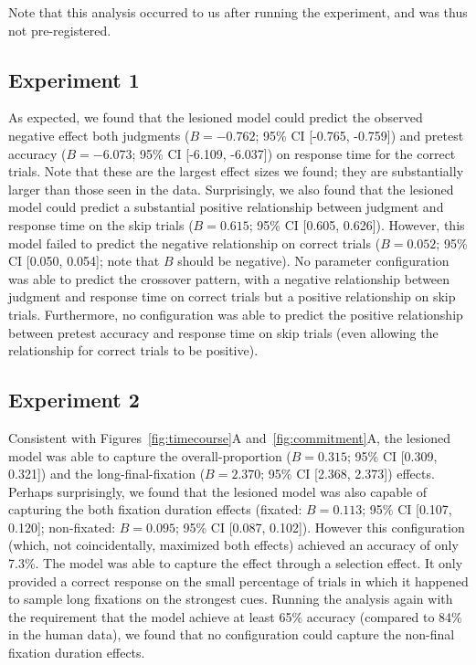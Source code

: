 Note that this analysis occurred to us after running the experiment, and was thus not pre-registered.

\subsection{Experiment 1}

As expected, we found that the lesioned model could predict the observed negative effect both judgments ($B = -0.762$; 95\% CI [-0.765, -0.759]) and pretest accuracy ($B = -6.073$; 95\% CI [-6.109, -6.037]) on response time for the correct trials. Note that these are the largest effect sizes we found; they are substantially larger than those seen in the data. Surprisingly, we also found that the lesioned model could predict a substantial positive relationship between judgment and response time on the skip trials ($B = 0.615$; 95\% CI [0.605, 0.626]). However, this model failed to predict the negative relationship on correct trials ($B = 0.052$; 95\% CI [0.050, 0.054]; note that $B$ should be negative). No parameter configuration was able to predict the crossover pattern, with a negative relationship between judgment and response time on correct trials but a positive relationship on skip trials. Furthermore, no configuration was able to predict the positive relationship between pretest accuracy and response time on skip trials (even allowing the relationship for correct trials to be positive).

\subsection{Experiment 2}

Consistent with Figures~\ref{fig:timecourse}A and~\ref{fig:commitment}A, the lesioned model was able to capture the overall-proportion ($B = 0.315$; 95\% CI [0.309, 0.321]) and the long-final-fixation ($B = 2.370$; 95\% CI [2.368, 2.373]) effects. Perhaps surprisingly, we found that the lesioned model was also capable of capturing the both fixation duration effects (fixated: $B = 0.113$; 95\% CI [0.107, 0.120]; non-fixated: $B = 0.095$; 95\% CI [0.087, 0.102]). However this configuration (which, not coincidentally, maximized both effects) achieved an accuracy of only 7.3\%. The model was able to capture the effect through a selection effect. It only provided a correct response on the small percentage of trials in which it happened to sample long fixations on the strongest cues. Running the analysis again with the requirement that the model achieve at least 65\% accuracy (compared to 84\% in the human data), we found that no configuration could capture the non-final fixation duration effects.


